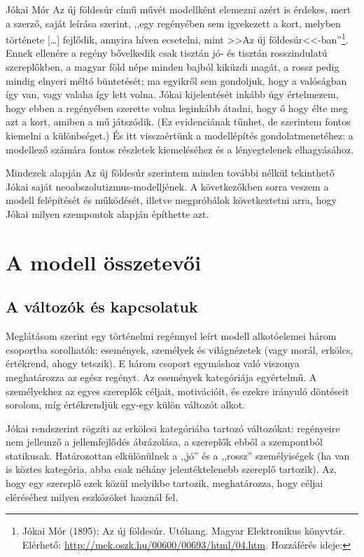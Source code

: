 \documentclass[a4paper,12pt]{thesis-ekf}
\begin{document}
    Jókai Mór Az új földesúr című művét modellként elemezni azért is érdekes, mert a szerző, saját leírása szerint,
        ,,egy regényében sem igyekezett a kort, melyben története [\dots] fejlődik, annyira híven ecsetelni,
        mint >>Az új földesúr<<-ban''\footnote{Jókai Mór (1895): Az új földesúr. Utóhang. Magyar Elektronikus könyvtár.
            Elérhető: \url{http://mek.oszk.hu/00600/00693/html/04.htm}.
            Hozzáférés ideje: }.
    Ennek ellenére a regény bővelkedik csak tisztán jó- és tisztán rosszindulatú szereplőkben, a magyar föld népe
        minden bajból kiküzdi magát, a rossz pedig mindig elnyeri méltó büntetését;
        ma egyikről sem gondoljuk, hogy a valóságban így van, vagy valaha így lett volna.
    Jókai kijelentését inkább úgy értelmezem, hogy ebben a regényében szerette volna leginkább átadni,
        hogy ő hogy élte meg azt a kort, amiben a mű játszódik.
    (Ez evidenciának tűnhet, de szerintem fontos kiemelni a különbséget.)
    És itt visszaértünk a modellépítés gondolatmenetéhez: a modellező számára fontos részletek kiemeléséhez
        és a lényegtelenek elhagyásához.

    Mindezek alapján Az új földesúr szerintem minden további nélkül tekinthető Jókai saját neoabszolutizmus-modelljének.
    A következőkben sorra veszem a modell felépítését és működését, illetve megpróbálok következtetni arra,
        hogy Jókai milyen szempontok alapján építhette azt.


    \chapter{A modell összetevői}\label{ch:a-modell-osszetevoi}
    
    \section{A változók és kapcsolatuk}\label{sec:a-valtozok-es-kapcsolatuk}

    Meglátásom szerint egy történelmi regénnyel leírt modell alkotóelemei három csoportba sorolhatók: 
        események, személyek és világnézetek (vagy morál, erkölcs, értékrend, ahogy tetszik).
    E három csoport egymáshoz való viszonya meghatározza az egész regényt. 
    Az események kategóriája egyértelmű. 
    A személyekhez az egyes szereplők céljait, motivációit, és ezekre irányuló döntéseit sorolom, 
        míg értékrendjük egy-egy külön változót alkot.

    Jókai rendszerint rögzíti az erkölcsi kategóriába tartozó változókat: 
        regényeire nem jellemző a jellemfejlődés ábrázolása, a szereplők ebből a szempontból statikusak. 
    Határozottan elkülönülnek a ,,jó'' és a ,,rossz'' személyiségek (ha van is köztes kategória, abba csak néhány
        jelentéktelenebb szereplő tartozik).
    Az, hogy egy szereplő ezek közül melyikbe tartozik, meghatározza, hogy céljai eléréséhez milyen eszközöket használ fel.
\end{document}
